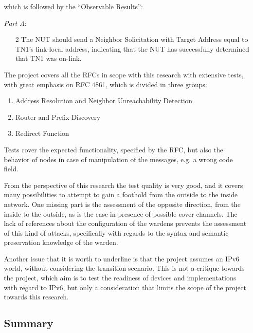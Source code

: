 \documentclass[12pt]{article}
\begin{document}
which is followed by the ``Observable Results'':

\textit{Part A}:
\vspace{-15pt}
\begin{enumerate}[noitemsep,topsep=0pt,partopsep=0pt]
 \item[2] The NUT should send a Neighbor Solicitation with Target Address equal to TN1’s link-local address, indicating that the NUT has successfully determined that TN1 was on-link.
\end{enumerate}


The project covers all the RFCs in scope with this research with extensive tests, with great emphasis on RFC 4861, which is divided in three groups:
\vspace{-15pt}
\begin{enumerate}[noitemsep,topsep=0pt,partopsep=0pt]
 \item Address Resolution and Neighbor Unreachability Detection
 \item Router and Prefix Discovery
 \item Redirect Function
\end{enumerate}

Tests cover the expected functionality, specified by the RFC, but also the behavior of nodes in case of manipulation of the messages, e.g. a wrong code field.

From the perspective of this research the test quality is very good, and it covers many possibilities to attempt to gain a foothold from the outside to the inside network. One missing part is the assessment of the opposite direction, from the inside to the outside, as is the case in presence of possible cover channels. The lack of references about the configuration of the wardens prevents the assessment of this kind of attacks, specifically with regards to the syntax and semantic preservation knowledge of the warden.

Another issue that it is worth to underline is that the project assumes an IPv6 world, without considering the transition scenario. This is not a critique towards the project, which aim is to test the readiness of devices and implementations with regard to IPv6, but only a consideration that limits the scope of the project towards this research.


\subsection{Summary}
\end{document}
